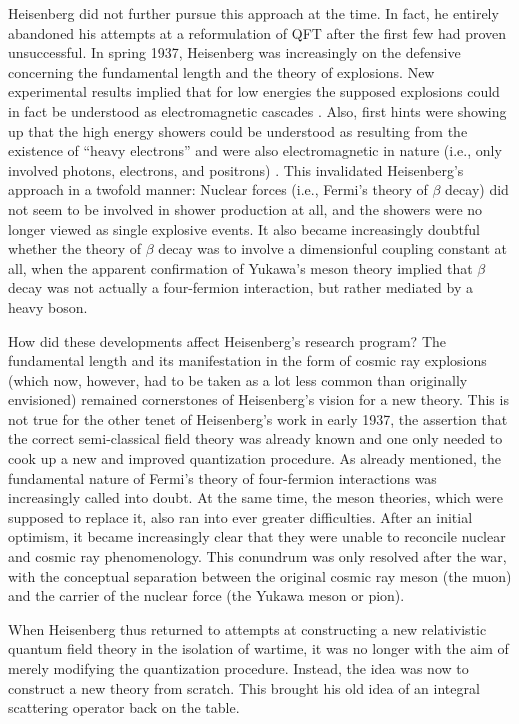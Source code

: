 \documentclass[12pt]{article}
\begin{document}
Heisenberg did not further pursue this approach at the time. In fact, he entirely abandoned his attempts at a reformulation of QFT after the first few had proven unsuccessful. In spring 1937, Heisenberg was increasingly on the defensive concerning the fundamental length and the theory of explosions. New experimental results implied that for low energies the supposed explosions could in fact be understood as electromagnetic cascades  \citep{cassidy_1981_cosmic}. Also, first hints were showing up that the high energy showers could be understood as resulting from the existence of  ``heavy electrons'' and were also electromagnetic in nature (i.e., only involved photons, electrons, and positrons) \citep{galison_1983_the-discovery}. This invalidated Heisenberg's approach in a twofold manner: Nuclear forces (i.e., Fermi's theory of $\beta$ decay) did not seem to be involved in shower production at all, and the showers were no longer viewed as single explosive events.  It also became increasingly doubtful whether the theory of $\beta$ decay was to involve a dimensionful coupling constant at all, when the apparent confirmation of Yukawa's meson theory implied that $\beta$ decay was not actually a four-fermion interaction, but rather mediated by a heavy boson.

How did these developments affect Heisenberg's research program? The fundamental length and its manifestation in the form of cosmic ray explosions (which now, however, had to be taken as a lot less common than originally envisioned) remained cornerstones of Heisenberg's vision for a new theory. This is not true for the other tenet of Heisenberg's work in early 1937, the assertion that the correct semi-classical field theory was already known and one only needed to cook up a new and improved quantization procedure. As already mentioned, the fundamental nature of Fermi's theory of four-fermion interactions was increasingly called into doubt. At the same time, the meson theories, which were supposed to replace it, also ran into ever greater difficulties. After an initial optimism, it became increasingly clear that they were unable to reconcile nuclear and cosmic ray phenomenology. This conundrum was only resolved after the war, with the conceptual separation between the original cosmic ray meson (the muon) and the carrier of the nuclear force (the Yukawa meson or pion).

When Heisenberg thus returned to attempts at constructing a new relativistic quantum field theory in the isolation of wartime, it was no longer with the aim of merely modifying the quantization procedure. Instead, the idea was now to construct a new theory from scratch. This brought his old idea of an integral scattering operator back on the table. 
\end{document}
